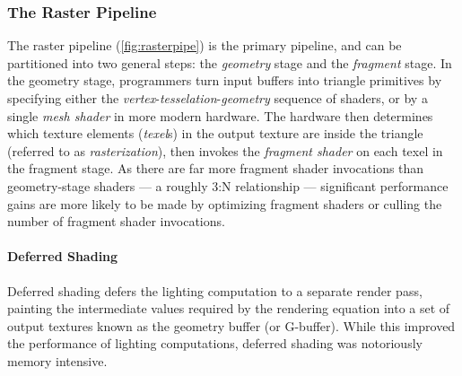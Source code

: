 \documentclass[review, acmsmall, nonacm]{acmart}
\begin{document}
\subsubsection{The Raster Pipeline}

The raster pipeline (\autoref{fig:rasterpipe}) is the primary pipeline, and can be partitioned into two general steps: the \emph{geometry} stage and the \emph{fragment} stage. In the geometry stage, programmers turn input buffers into triangle primitives by specifying either the \emph{vertex}-\emph{tesselation}-\emph{geometry} sequence of shaders, or by a single \emph{mesh shader} in more modern hardware. The hardware then determines which texture elements (\emph{texel}s) in the output texture are inside the triangle (referred to as \emph{rasterization}), then invokes the \emph{fragment shader} on each texel in the fragment stage. As there are far more fragment shader invocations than geometry-stage shaders --- a roughly 3:N relationship --- significant performance gains are more likely to be made by optimizing fragment shaders or culling the number of fragment shader invocations.


\paragraph{Deferred Shading} Deferred shading defers the lighting computation to a separate render pass, painting the intermediate values required by the rendering equation \cite{kajiyaRenderingEquation1986} into a set of output textures known as the geometry buffer (or G-buffer). While this improved the performance of lighting computations, deferred shading was notoriously memory intensive. 


\end{document}

